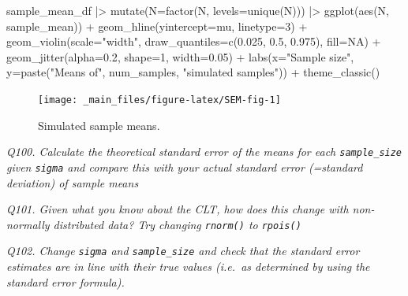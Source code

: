 \documentclass[
  11pt,
  a4paper,
]{book}
\newenvironment{Shaded}{\begin{snugshade}}{\end{snugshade}}
\newcommand{\AttributeTok}[1]{\textcolor[rgb]{0.77,0.63,0.00}{#1}}
\newcommand{\ConstantTok}[1]{\textcolor[rgb]{0.00,0.00,0.00}{#1}}
\newcommand{\DecValTok}[1]{\textcolor[rgb]{0.00,0.00,0.81}{#1}}
\newcommand{\FloatTok}[1]{\textcolor[rgb]{0.00,0.00,0.81}{#1}}
\newcommand{\FunctionTok}[1]{\textcolor[rgb]{0.00,0.00,0.00}{#1}}
\newcommand{\NormalTok}[1]{#1}
\newcommand{\SpecialCharTok}[1]{\textcolor[rgb]{0.00,0.00,0.00}{#1}}
\newcommand{\StringTok}[1]{\textcolor[rgb]{0.31,0.60,0.02}{#1}}
\begin{document}
\begin{Shaded}
\begin{Highlighting}[]
\NormalTok{sample\_mean\_df }\SpecialCharTok{|\textgreater{}}
  \FunctionTok{mutate}\NormalTok{(}\AttributeTok{N=}\FunctionTok{factor}\NormalTok{(N, }\AttributeTok{levels=}\FunctionTok{unique}\NormalTok{(N))) }\SpecialCharTok{|\textgreater{}}
  \FunctionTok{ggplot}\NormalTok{(}\FunctionTok{aes}\NormalTok{(N, sample\_mean)) }\SpecialCharTok{+} 
  \FunctionTok{geom\_hline}\NormalTok{(}\AttributeTok{yintercept=}\NormalTok{mu, }\AttributeTok{linetype=}\DecValTok{3}\NormalTok{) }\SpecialCharTok{+}
  \FunctionTok{geom\_violin}\NormalTok{(}\AttributeTok{scale=}\StringTok{"width"}\NormalTok{, }\AttributeTok{draw\_quantiles=}\FunctionTok{c}\NormalTok{(}\FloatTok{0.025}\NormalTok{, }\FloatTok{0.5}\NormalTok{, }\FloatTok{0.975}\NormalTok{), }\AttributeTok{fill=}\ConstantTok{NA}\NormalTok{) }\SpecialCharTok{+}
  \FunctionTok{geom\_jitter}\NormalTok{(}\AttributeTok{alpha=}\FloatTok{0.2}\NormalTok{, }\AttributeTok{shape=}\DecValTok{1}\NormalTok{, }\AttributeTok{width=}\FloatTok{0.05}\NormalTok{) }\SpecialCharTok{+} 
  \FunctionTok{labs}\NormalTok{(}\AttributeTok{x=}\StringTok{"Sample size"}\NormalTok{, }\AttributeTok{y=}\FunctionTok{paste}\NormalTok{(}\StringTok{"Means of"}\NormalTok{, num\_samples, }\StringTok{"simulated samples"}\NormalTok{)) }\SpecialCharTok{+}
  \FunctionTok{theme\_classic}\NormalTok{()}
\end{Highlighting}
\end{Shaded}

\begin{figure}

{\centering \texttt{[image: \_main\_files/figure-latex/SEM-fig-1]} 

}

\caption{Simulated sample means.}\label{fig:SEM-fig}
\end{figure}

\emph{Q100. Calculate the theoretical standard error of the means for each \texttt{sample\_size} given \texttt{sigma} and compare this with your actual standard error (=standard deviation) of sample means}

\emph{Q101. Given what you know about the CLT, how does this change with non-normally distributed data? Try changing \texttt{rnorm()} to \texttt{rpois()}}

\emph{Q102. Change \texttt{sigma} and \texttt{sample\_size} and check that the standard error estimates are in line with their true values (i.e.~as determined by using the standard error formula).}
\end{document}
